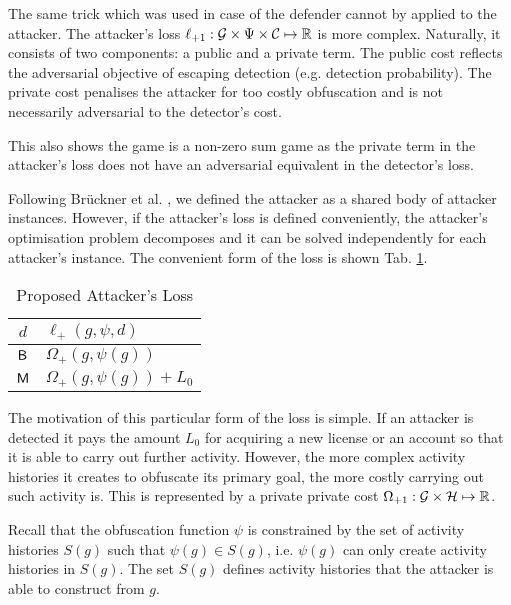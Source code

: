 The same trick which was used in case of the defender cannot by applied to the attacker. The attacker's loss $\ell_{{\text{+}1}}: \mathcal{G} \times \Psi \times \mathcal{C} \mapsto \mathbb{R}$ is more complex. Naturally, it consists of two components: a public and a private term. The public cost reflects the adversarial objective of escaping detection (e.g. detection probability). The private cost penalises the attacker for too costly obfuscation and is not necessarily adversarial to the detector's cost.

This also shows the game is a non-zero sum game as the private term in the attacker's loss does not have an adversarial equivalent in the detector's loss.

Following Brückner et al. \cite{stackelberg_games}, we defined the attacker as a shared body of attacker instances. However, if the attacker's loss is defined conveniently, the attacker's optimisation problem decomposes and it can be solved independently for each attacker's instance. The convenient form of the loss is shown Tab. \ref{tab:attacker_loss}.

\begin{table}
    \centering

        \begin{tabular}{|c||l|}
            \hline
            $d$    & $\ell_\plus(g, \psi, d)$         \\ \hline\hline
            $\mathsf{B}$ & $\Omega_\plus(g, \psi(g))$       \\ \hline
            $\mathsf{M}$ & $\Omega_\plus(g, \psi(g)) + L_0$ \\ \hline
        \end{tabular}

    \caption{Proposed Attacker's Loss}
    \label{tab:attacker_loss}
\end{table}

The motivation of this particular form of the loss is simple. If an attacker is detected it pays the amount $L_0$ for acquiring a new license or an account so that it is able to carry out further activity. However, the more complex activity histories it creates to obfuscate its primary goal, the more costly carrying out such activity is. This is represented by a private private cost $\Omega_{{\text{+}1}}: \mathcal{G} \times \mathcal{H} \mapsto \mathbb{R}$.

Recall that the obfuscation function $\psi$ is constrained by the set of activity histories $S(g)$ such that $\psi(g) \in S(g)$, i.e. $\psi(g)$ can only create activity histories in $S(g)$. The set $S(g)$ defines activity histories that the attacker is able to construct from $g$.

